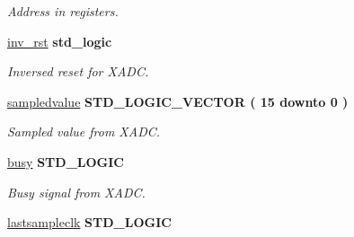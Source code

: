 \begin{DoxyCompactItemize}
\begin{DoxyCompactList}\small\item\em Address in registers. \end{DoxyCompactList}\item 
\hypertarget{classADC__TOP_1_1TOP__ADC_ac58565a65b10392b2476534d234c8871}{\hyperlink{classADC__TOP_1_1TOP__ADC_ac58565a65b10392b2476534d234c8871}{inv\-\_\-rst} {\bfseries \textcolor{comment}{std\-\_\-logic}\textcolor{vhdlchar}{ }} }\label{classADC__TOP_1_1TOP__ADC_ac58565a65b10392b2476534d234c8871}

\begin{DoxyCompactList}\small\item\em Inversed reset for X\-A\-D\-C. \end{DoxyCompactList}\item 
\hypertarget{classADC__TOP_1_1TOP__ADC_ad5797d4ae2d654477e555700f8c3e43f}{\hyperlink{classADC__TOP_1_1TOP__ADC_ad5797d4ae2d654477e555700f8c3e43f}{sampledvalue} {\bfseries \textcolor{comment}{S\-T\-D\-\_\-\-L\-O\-G\-I\-C\-\_\-\-V\-E\-C\-T\-O\-R}\textcolor{vhdlchar}{ }\textcolor{vhdlchar}{(}\textcolor{vhdlchar}{ }\textcolor{vhdlchar}{ } \textcolor{vhdldigit}{15} \textcolor{vhdlchar}{ }\textcolor{vhdlchar}{ }\textcolor{vhdlchar}{ }\textcolor{vhdlkeyword}{downto}\textcolor{vhdlchar}{ }\textcolor{vhdlchar}{ }\textcolor{vhdlchar}{ } \textcolor{vhdldigit}{0} \textcolor{vhdlchar}{ }\textcolor{vhdlchar}{)}\textcolor{vhdlchar}{ }} }\label{classADC__TOP_1_1TOP__ADC_ad5797d4ae2d654477e555700f8c3e43f}

\begin{DoxyCompactList}\small\item\em Sampled value from X\-A\-D\-C. \end{DoxyCompactList}\item 
\hypertarget{classADC__TOP_1_1TOP__ADC_a765e6fd5e52807fd480f8e8477f35144}{\hyperlink{classADC__TOP_1_1TOP__ADC_a765e6fd5e52807fd480f8e8477f35144}{busy} {\bfseries \textcolor{comment}{S\-T\-D\-\_\-\-L\-O\-G\-I\-C}\textcolor{vhdlchar}{ }} }\label{classADC__TOP_1_1TOP__ADC_a765e6fd5e52807fd480f8e8477f35144}

\begin{DoxyCompactList}\small\item\em Busy signal from X\-A\-D\-C. \end{DoxyCompactList}\item 
\hypertarget{classADC__TOP_1_1TOP__ADC_afda8ab14219d5cf291d97fd808265f14}{\hyperlink{classADC__TOP_1_1TOP__ADC_afda8ab14219d5cf291d97fd808265f14}{lastsampleclk} {\bfseries \textcolor{comment}{S\-T\-D\-\_\-\-L\-O\-G\-I\-C}\textcolor{vhdlchar}{ }} }\label{classADC__TOP_1_1TOP__ADC_afda8ab14219d5cf291d97fd808265f14}


\end{DoxyCompactItemize}
